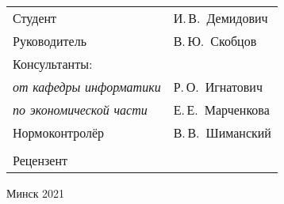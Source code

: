 \begin{titlepage}
\begin{center}
    \begin{tabular}{ p{}p{} }
      Студент & И.\,В.~Демидович \\
      Руководитель & В.\,Ю.~Скобцов \\
      Консультанты: &\\
      \hspace*{3ex}\emph{от кафедры информатики} & Р.\,О.~Игнатович \\
      \hspace*{3ex}\emph{по экономической части} & Е.\,Е.~Марченкова \\
      Нормоконтролёр & В.\,В.~Шиманский\\
      & \\
      Рецензент &
    \end{tabular}
    
    \vfill
    {\normalsize Минск 2021}
  \end{center}
\end{titlepage}

